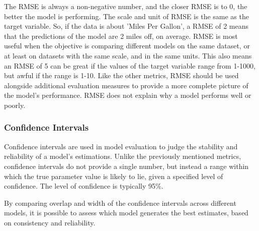 \noindent The RMSE is always a non-negative number, and the closer RMSE is to 0, the better the model is performing. The scale and unit of RMSE is the same as the target variable. So, if the data is about 'Miles Per Gallon', a RMSE of 2 means that the predictions of the model are 2 miles off, on average. RMSE is most useful when the objective is comparing different models on the same dataset, or at least on datasets with the same scale, and in the same units. This also means an RMSE of 5 can be great if the values of the target variable range from 1-1000, but awful if the range is 1-10. Like the other metrics, RMSE should be used alongside additional evaluation measures to provide a more complete picture of the model’s performance. RMSE does not explain why a model performs well or poorly.
\newpage

\subsubsection{Confidence Intervals}
Confidence intervals are used in model evaluation to judge the stability and reliability of a model's estimations. Unlike the previously mentioned metrics, confidence intervals do not provide a single number, but instead a range within which the true parameter value is likely to lie, given a specified level of confidence. The level of confidence is typically 95\%. \newline 

\noindent By comparing overlap and width of the confidence intervals across different models, it is possible to assess which model generates the best estimates, based on consistency and reliability.